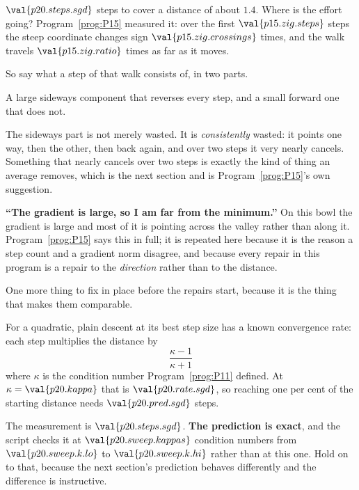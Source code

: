 \begin{fr}
$\val{p20.steps.sgd}$ steps to cover a distance of about $\num{1.4}$. Where is
the effort going? Program~\ref{prog:P15} measured it: over the first
$\val{p15.zig.steps}$ steps the steep coordinate changes sign
$\val{p15.zig.crossings}$ times, and the walk travels $\val{p15.zig.ratio}$
times as far as it moves.

So say what a step of that walk consists of, in two parts.
\nextframe
\end{fr}

\begin{fr}
\begin{ansblock}
A large sideways component that reverses every step, and a small forward one
that does not.
\end{ansblock}

The sideways part is not merely wasted. It is \emph{consistently} wasted: it
points one way, then the other, then back again, and over two steps it very
nearly cancels. Something that nearly cancels over two steps is exactly the
kind of thing an average removes, which is the next section and is
Program~\ref{prog:P15}'s own suggestion.

\begin{trapbox}
\textbf{\enquote{The gradient is large, so I am far from the minimum.}} On
this bowl the gradient is large and most of it is pointing across the valley
rather than along it. Program~\ref{prog:P15} says this in full; it is repeated
here because it is the reason a step count and a gradient norm disagree, and
because every repair in this program is a repair to the \emph{direction}
rather than to the distance.
\end{trapbox}
\end{fr}

\begin{fr}
One more thing to fix in place before the repairs start, because it is the
thing that makes them comparable.

For a quadratic, plain descent at its best step size has a known convergence
rate: each step multiplies the distance by
\[ \frac{\kappa - 1}{\kappa + 1} \]
where $\kappa$ is the condition number Program~\ref{prog:P11} defined. At
$\kappa = \val{p20.kappa}$ that is $\val{p20.rate.sgd}$, so reaching one per
cent of the starting distance needs $\val{p20.pred.sgd}$ steps.

The measurement is $\val{p20.steps.sgd}$. \textbf{The prediction is exact}, and
the script checks it at $\val{p20.sweep.kappas}$ condition numbers from
$\val{p20.sweep.k.lo}$ to
$\val{p20.sweep.k.hi}$ rather than at this one. Hold on to that, because the
next section's prediction behaves differently and the difference is
instructive.
\end{fr}

